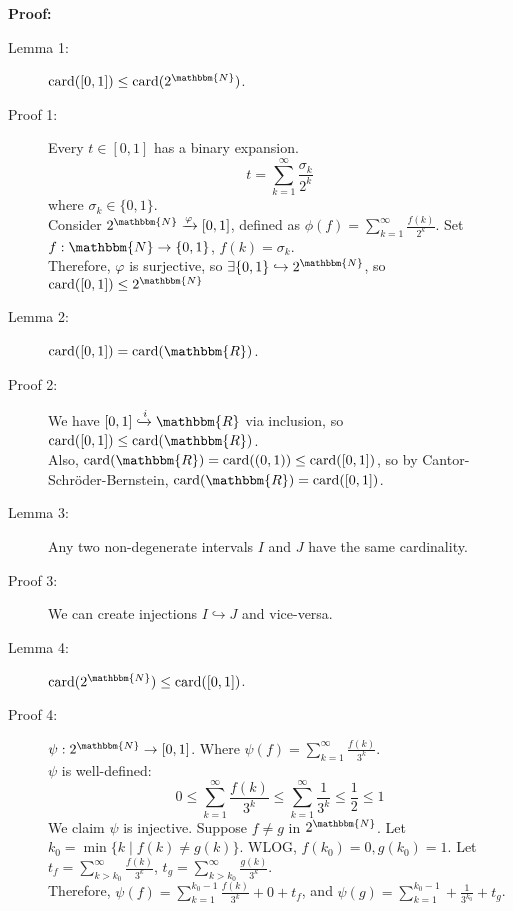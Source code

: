 \documentclass[10pt]{extarticle}
\newcommand{\card}{\text{card}}
\newcommand{\N}{\mathbbm{N}}
\newcommand{\R}{\mathbbm{R}}
\begin{document}
      \textbf{Proof:}
    \begin{description}
      \item[Lemma 1:] $\card([0,1]) \leq \card(2^{\N})$.
      \item[Proof 1:] Every $t\in [0,1]$ has a binary expansion.
        \[
          t = \sum_{k = 1}^{\infty} \frac{\sigma_k}{2^k}
        \] 
        where $\sigma_k \in \{0,1\}$. \\

        Consider $2^{\N} \xrightarrow{\varphi} [0,1]$, defined as $\displaystyle \phi(f) = \sum_{k=1}^{\infty}\frac{f(k)}{2^k}$. Set $f: \N \rightarrow \{0,1\}$, $f(k) = \sigma_k$.\\

          Therefore, $\varphi$ is surjective, so $\exists \{0,1\}\hookrightarrow 2^{\N}$, so $\card([0,1]) \leq 2^{\N}$
        \item[Lemma 2:] $\card([0,1]) = \card(\R)$.
        \item[Proof 2:] We have $[0,1]\xhookrightarrow{i} \R$ via inclusion, so $\card([0,1])\leq \card(\R)$.\\

          Also, $\card(\R) = \card((0,1)) \leq \card([0,1])$, so by Cantor-Schröder-Bernstein, $\card(\R) = \card([0,1])$.
        \item[Lemma 3:] Any two non-degenerate intervals $I$ and $J$ have the same cardinality. 
        \item[Proof 3:] We can create injections $I\hookrightarrow J$ and vice-versa.
        \item[Lemma 4:] $\card(2^{\N}) \leq \card([0,1])$.
        \item[Proof 4:] $\psi: 2^{\N} \rightarrow [0,1]$. Where $\psi(f) = \sum_{k = 1}^{\infty}\frac{f(k)}{3^k}$.\\

          $\psi$ is well-defined:
          \[
            0\leq \sum_{k=1}^{\infty}\frac{f(k)}{3^k} \leq \sum_{k=1}^{\infty}\frac{1}{3^k} \leq \frac{1}{2} \leq 1
          \] 
          We claim $\psi$ is injective. Suppose $f\neq g$ in $2^{\N}$. Let $k_0 = \min\{k\mid f(k) \neq g(k)\}$. WLOG, $f(k_0) = 0, g(k_0) = 1$. Let $t_f = \sum_{k>k_0}^{\infty}\frac{f(k)}{3^k}$, $t_g = \sum_{k>k_0}^{\infty}\frac{g(k)}{3^k}$.\\

          Therefore, $\psi(f) = \sum_{k = 1}^{k_0-1}\frac{f(k)}{3^k} + 0 + t_f$, and $\psi(g) = \sum_{k=1}^{k_0-1} + \frac{1}{3^{k_0}} + t_g$.\\


\end{description}
\end{document}
